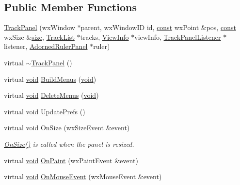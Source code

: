 \subsection*{Public Member Functions}
\begin{DoxyCompactItemize}
\item 
\hyperlink{class_track_panel_a1b553c63e4513509a67e5a63eb61fffa}{Track\+Panel} (wx\+Window $\ast$parent, wx\+Window\+ID id, \hyperlink{getopt1_8c_a2c212835823e3c54a8ab6d95c652660e}{const} wx\+Point \&pos, \hyperlink{getopt1_8c_a2c212835823e3c54a8ab6d95c652660e}{const} wx\+Size \&\hyperlink{group__lavu__mem_ga854352f53b148adc24983a58a1866d66}{size}, \hyperlink{class_track_list}{Track\+List} $\ast$tracks, \hyperlink{class_view_info}{View\+Info} $\ast$view\+Info, \hyperlink{class_track_panel_listener}{Track\+Panel\+Listener} $\ast$listener, \hyperlink{class_adorned_ruler_panel}{Adorned\+Ruler\+Panel} $\ast$ruler)
\item 
virtual \hyperlink{class_track_panel_a1bdbcb07fd3b1ef964eb4e769be4a161}{$\sim$\+Track\+Panel} ()
\item 
virtual \hyperlink{sound_8c_ae35f5844602719cf66324f4de2a658b3}{void} \hyperlink{class_track_panel_a7589c02239fa75a32f8bfcc78b9a6e63}{Build\+Menus} (\hyperlink{sound_8c_ae35f5844602719cf66324f4de2a658b3}{void})
\item 
virtual \hyperlink{sound_8c_ae35f5844602719cf66324f4de2a658b3}{void} \hyperlink{class_track_panel_af7bfecf9618f80f743ed761a7c1be8e8}{Delete\+Menus} (\hyperlink{sound_8c_ae35f5844602719cf66324f4de2a658b3}{void})
\item 
virtual \hyperlink{sound_8c_ae35f5844602719cf66324f4de2a658b3}{void} \hyperlink{class_track_panel_a1a326663822597a30806a592922c06b1}{Update\+Prefs} ()
\item 
virtual \hyperlink{sound_8c_ae35f5844602719cf66324f4de2a658b3}{void} \hyperlink{class_track_panel_ae9a51cf72d4da3e01256eb1ef379c192}{On\+Size} (wx\+Size\+Event \&event)
\begin{DoxyCompactList}\small\item\em \hyperlink{class_track_panel_ae9a51cf72d4da3e01256eb1ef379c192}{On\+Size()} is called when the panel is resized. \end{DoxyCompactList}\item 
virtual \hyperlink{sound_8c_ae35f5844602719cf66324f4de2a658b3}{void} \hyperlink{class_track_panel_acec42866dbc6e990300c70787539ad2e}{On\+Paint} (wx\+Paint\+Event \&event)
\item 
virtual \hyperlink{sound_8c_ae35f5844602719cf66324f4de2a658b3}{void} \hyperlink{class_track_panel_a9f7065e0737a8a911c449f970da3bbf3}{On\+Mouse\+Event} (wx\+Mouse\+Event \&event)

\end{DoxyCompactItemize}
